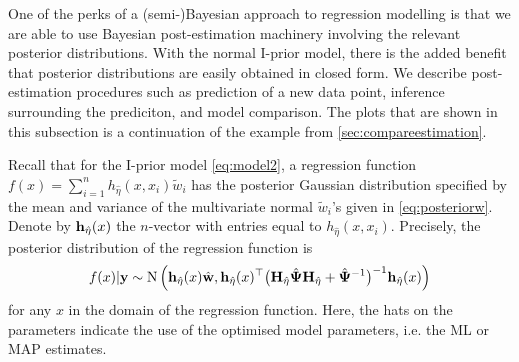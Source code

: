 One of the perks of a (semi-)Bayesian approach to regression modelling is that we are able to use Bayesian post-estimation machinery involving the relevant posterior distributions.
With the normal I-prior model, there is the added benefit that posterior distributions are easily obtained in closed form.
We describe post-estimation procedures such as prediction of a new data point, inference surrounding the prediciton, and model comparison.
The plots that are shown in this subsection is a continuation of the example from \cref{sec:compareestimation}.

Recall that for the I-prior model \cref{eq:model2}, a regression function $f(x) = \sum_{i=1}^n h_{\hat\eta}(x,x_i)\tilde w_i$
has the posterior Gaussian distribution specified by the mean and variance of the multivariate normal $\tilde w_i$'s given in \cref{eq:posteriorw}.
Denote by ${\mathbf h}_{\hat\eta}(x)$ the $n$-vector with entries equal to $h_{\hat\eta}(x,x_i)$.
Precisely, the posterior distribution of the regression function is
\begin{align}
  f(x) | {\mathbf y} \sim \operatorname{N} \Big( 
  {\mathbf h}_{\hat\eta}(x)\hat{{\mathbf w}}, 
  {\mathbf h}_{\hat\eta}(x)^\top \big({\mathbf H}_{\hat\eta}\hat{{\bm\Psi}}{\mathbf H}_{\hat\eta} + \hat{{\bm\Psi}}^{-1}\big)^{-1} {\mathbf h}_{\hat\eta}(x) 
  \Big)
\end{align}
for any $x$ in the domain of the regression function.
Here, the hats on the parameters indicate the use of the optimised model parameters, i.e. the ML or MAP estimates.

